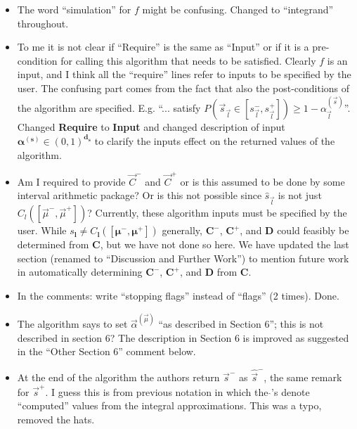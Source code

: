 \documentclass{article}[12pt]
\newcommand{\Referee}[1]{{\color{blue} #1 \newline}}
\begin{document}
\begin{itemize}
    \item \Referee{The word ``simulation'' for $f$ might be confusing.}Changed to ``integrand'' throughout.
    \item \Referee{To me it is not clear if ``Require'' is the same as ``Input'' or if it is a pre-condition for calling this algorithm that needs to be satisfied. Clearly $f$ is an input, and I think all the ``require'' lines refer to inputs to be specified by the user. The confusing part comes from the fact that also the post-conditions of the algorithm are specified. E.g. ``... satisfy $P(\vec{s}_{\vec{l}} \in [s_{\vec{l}}^-, s_{\vec{l}}^+]) \ge 1 -\alpha_{\vec{l}}^{(\vec{s})}$''.}Changed \textbf{Require} to \textbf{Input} and changed description of  input $\boldsymbol{\alpha}^{(\boldsymbol{s})} \in (0,1)^{\boldsymbol{d}_{\boldsymbol{s}}}$ to clarify the inputs effect on the returned values of the algorithm.
    \item \Referee{Am I required to provide $\vec{C}^-$ and $\vec{C}^+$ or is this assumed to be done by some interval arithmetic package? Or is this not possible since $\hat{s}_{\vec{l}}$ is not just $C_l([\vec{\mu}^-,\vec{\mu}^+])$?}Currently, these algorithm inputs must be specified by the user. While $s_{\boldsymbol{l}} \neq C_{\boldsymbol{l}}([\boldsymbol{\mu}^-,\boldsymbol{\mu}^+])$ generally, $\boldsymbol{C}^-$, $\boldsymbol{C}^+$, and $\boldsymbol{D}$ could feasibly be determined from $\boldsymbol{C}$, but we have not done so here. We have updated the last section (renamed to ``Discussion and Further Work'') to mention future work in automatically determining $\boldsymbol{C}^-$, $\boldsymbol{C}^+$, and $\boldsymbol{D}$ from $\boldsymbol{C}$.
    \item \Referee{In the comments: write ``stopping flags'' instead of ``flags'' (2 times).}Done.
    \item \Referee{The algorithm says to set ${\vec{\alpha}}^{(\vec{\mu})}$ ``as described in Section 6''; this is not described in section 6?}The  description in Section 6 is improved as suggested in the ``Other Section 6'' comment below. 
    \item \Referee{At the end of the algorithm the authors return $\vec{s}^-$ as $\hat{\vec{s}}^-$, the same remark for $\vec{s}^+$. I guess this is from previous notation in which the $\hat{}$'s denote ``computed'' values from the integral approximations.}This was a typo, removed the hats.
\end{itemize}
\end{document}
